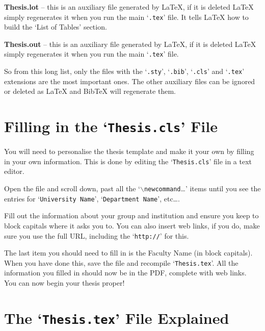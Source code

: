 \textbf{Thesis.lot} -- this is an auxiliary file generated by \LaTeX{}, if it is deleted \LaTeX{} simply regenerates it when you run the main `\texttt{.tex}' file. It tells \LaTeX{} how to build the `List of Tables' section.

\textbf{Thesis.out} -- this is an auxiliary file generated by \LaTeX{}, if it is deleted \LaTeX{} simply regenerates it when you run the main `\texttt{.tex}' file.


So from this long list, only the files with the `\texttt{.sty}', `\texttt{.bib}', `\texttt{.cls}' and `\texttt{.tex}' extensions are the most important ones. The other auxiliary files can be ignored or deleted as \LaTeX{} and BibTeX will regenerate them.


\section{Filling in the `\texttt{Thesis.cls}' File}\label{FillingFile}

You will need to personalise the thesis template and make it your own by filling in your own information. This is done by editing the `\texttt{Thesis.cls}' file in a text editor.

Open the file and scroll down, past all the `$\backslash$\texttt{newcommand}\ldots' items until you see the entries for `\texttt{University Name}', `\texttt{Department Name}', etc\ldots.

Fill out the information about your group and institution and ensure you keep to block capitals where it asks you to. You can also insert web links, if you do, make sure you use the full URL, including the `\texttt{http://}' for this.

The last item you should need to fill in is the Faculty Name (in block capitals). When you have done this, save the file and recompile `\texttt{Thesis.tex}'. All the information you filled in should now be in the PDF, complete with web links. You can now begin your thesis proper!


\section{The `\texttt{Thesis.tex}' File Explained}

